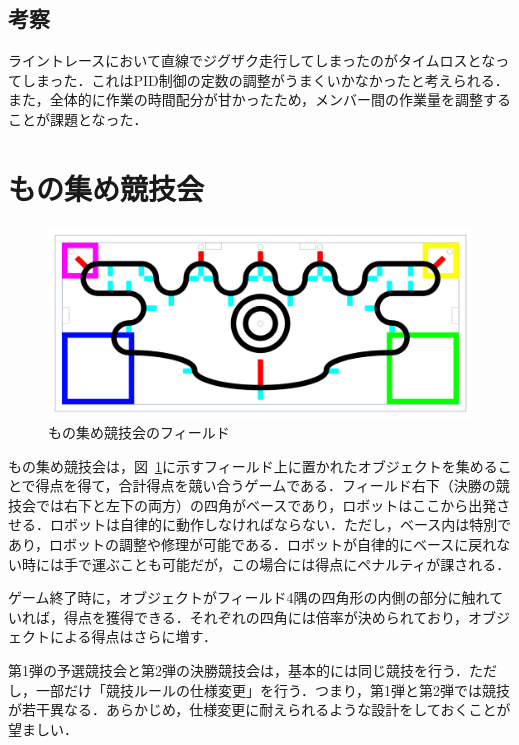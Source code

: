 \begin{multicols*}{2}
\subsection{考察}%
ライントレースにおいて直線でジグザク走行してしまったのがタイムロスとなってしまった．これはPID制御の定数の調整がうまくいかなかったと考えられる．また，全体的に作業の時間配分が甘かったため，メンバー間の作業量を調整することが課題となった．

\section{もの集め競技会}
\begin{figure}[!t]
  \centering
    \includegraphics[width=14cm]{img/monocourse.png}
  \caption{もの集め競技会のフィールド} \label{fig:monocourse}
\end{figure}

もの集め競技会は，図~\ref{fig:monocourse}に示すフィールド上に置かれたオブジェクトを集めることで得点を得て，合計得点を競い合うゲームである．フィールド右下（決勝の競技会では右下と左下の両方）の四角がベースであり，ロボットはここから出発させる．ロボットは自律的に動作しなければならない．ただし，ベース内は特別であり，ロボットの調整や修理が可能である．ロボットが自律的にベースに戻れない時には手で運ぶことも可能だが，この場合には得点にペナルティが課される．

ゲーム終了時に，オブジェクトがフィールド4隅の四角形の内側の部分に触れていれば，得点を獲得できる．それぞれの四角には倍率が決められており，オブジェクトによる得点はさらに増す．

第1弾の予選競技会と第2弾の決勝競技会は，基本的には同じ競技を行う．ただし，一部だけ「競技ルールの仕様変更」を行う．つまり，第1弾と第2弾では競技が若干異なる．あらかじめ，仕様変更に耐えられるような設計をしておくことが望ましい．


\end{multicols*}
